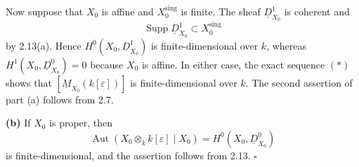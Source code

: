 Now suppose that $X_0$ is affine and $X_0^{\mathrm{sing}}$ is finite.
The sheaf $\underline D^1_{X_0}$ is coherent and
\[
\operatorname{Supp}\underline D^1_{X_0}
\subset X_0^{\mathrm{sing}}
\]
by 2.13(a). Hence $H^0(X_0,\underline D^1_{X_0})$ is
finite-dimensional over $k$, whereas
$H^1(X_0,\underline D^0_{X_0})=0$ because $X_0$ is affine. In either
case, the exact sequence $(*)$ shows that
$[\underline M_{X_0}(k[\varepsilon])]$ is finite-dimensional over
$k$. The second assertion of part (a) follows from 2.7.

\smallskip
\noindent\textbf{(b)} If $X_0$ is proper, then
\[
\operatorname{Aut}(X_0\otimes_k k[\varepsilon]\mid X_0)
=H^0(X_0,\underline D^0_{X_0})
\]
is finite-dimensional, and the assertion follows from 2.13.
\hfill$\square$
